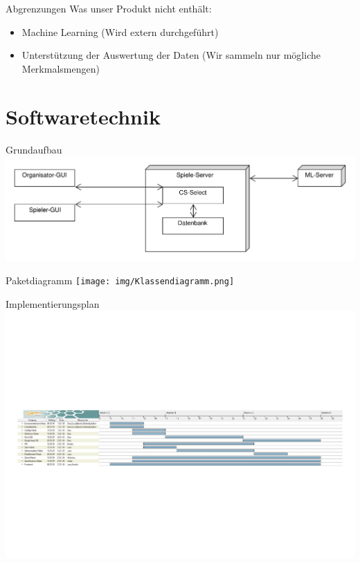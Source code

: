\documentclass[xcolor=dvipsnames]{beamer}
\begin{document}
    \begin{frame}{Abgrenzungen}
        Was unser Produkt nicht enthält:
        \begin{itemize}
            \item Machine Learning (Wird extern durchgeführt)
            \item Unterstützung der Auswertung der Daten (Wir sammeln nur mögliche Merkmalsmengen)
        \end{itemize}
    \end{frame}
 
    \renewcommand{\arraystretch}{1.5}

	\section{Softwaretechnik}
	\begin{frame}{Grundaufbau}
	\centering
	\includegraphics[width=\textwidth]{img/Architektur.pdf}
	\end{frame}

	\begin{frame}{Paketdiagramm}
	\centering
	\texttt{[image: img/Klassendiagramm.png]}
	\end{frame}

	\begin{frame}{Implementierungsplan}
	\includegraphics[width=\textwidth]{img/gantt.pdf}
	\end{frame}
\end{document}
